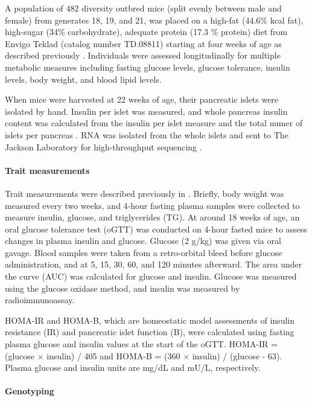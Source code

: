 \documentclass[
]{article}
\begin{document}
A population of 482 diversity outbred mice (split evenly between male
and female) from generates 18, 19, and 21, was placed on a high-fat
(44.6\% kcal fat), high-sugar (34\% carbohydrate), adequate protein
(17.3 \% protein) diet from Envigo Teklad (catalog number TD.08811)
starting at four weeks of age as described previously
\cite{pmid29567659}. Individuals were assessed longitudinally for
multiple metabolic measures including fasting glucose levels, glucose
tolerance, insulin levels, body weight, and blood lipid levels.

When mice were harvested at 22 weeks of age, their pancreatic islets
were isolated by hand. Insulin per islet was measured, and whole
pancreas insulin content was calculated from the insulin per islet
measure and the total numer of islets per pancreas \cite{pmid29567659}.
RNA was isolated from the whole islets and sent to The Jackson
Laboratory for high-throughput sequencing \cite{pmid29567659}.

\paragraph{Trait measurements}\label{trait-measurements}

Trait measurements were described previously in \cite{pmid29567659}.
Briefly, body weight was measured every two weeks, and 4-hour fasting
plasma samples were collected to measure insulin, glucose, and
triglycerides (TG). At around 18 weeks of age, an oral glucose tolerance
test (oGTT) was conducted on 4-hour fasted mice to assess changes in
plasma insulin and glucose. Glucose (2 g/kg) was given via oral gavage.
Blood samples were taken from a retro-orbital bleed before glucose
administration, and at 5, 15, 30, 60, and 120 minutes afterward. The
area under the curve (AUC) was calculated for glucose and insulin.
Glucose was measured using the glucose oxidase method, and insulin was
measured by radioimmunoassay.

HOMA-IR and HOMA-B, which are homeostatic model assessments of insulin
resistance (IR) and pancreatic islet function (B), were calculated using
fasting plasma glucose and insulin values at the start of the oGTT.
HOMA-IR = (glucose \(\times\) insulin) / 405 and HOMA-B = (360
\(\times\) insulin) / (glucose - 63). Plasma glucose and insulin units
are mg/dL and mU/L, respectively.

\paragraph{Genotyping}\label{genotyping}
\end{document}

